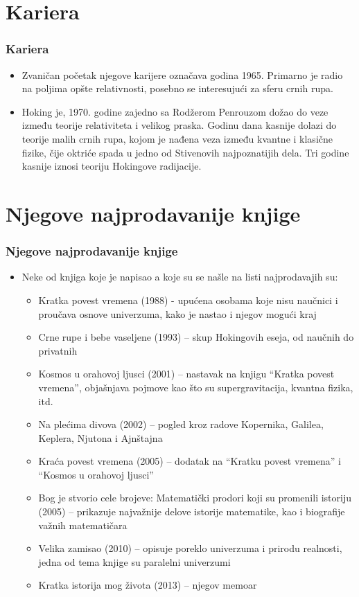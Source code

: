 \documentclass{beamer}
\begin{document}
\section{Kariera}

\begin{frame}[fragile]\frametitle{Kariera}
\begin{itemize}	 \fontsize{9}{6}\selectfont
\item  Zvaničan početak njegove karijere označava godina 1965. Primarno je radio na poljima opšte relativnosti, posebno se interesujući za sferu crnih rupa.
\item Hoking je, 1970. godine zajedno sa Rodžerom Penrouzom dožao do veze između teorije relativiteta i velikog praska. Godinu dana kasnije dolazi do teorije malih crnih rupa, kojom je nađena veza između kvantne i klasične fizike, čije oktriće spada u jedno od Stivenovih najpoznatijih dela. Tri godine kasnije iznosi teoriju Hokingove radijacije. 
\end{itemize}
\end{frame}

\section{Njegove najprodavanije knjige}

\begin{frame}[fragile]\frametitle{ Njegove najprodavanije knjige}
	\begin{itemize}	\fontsize{9}{6}\selectfont	
		\item Neke od knjiga koje je napisao a koje su se našle na listi najprodavajih su:
		\begin{itemize}\fontsize{9}{6}\selectfont
 \item Kratka povest vremena (1988) - upućena osobama koje nisu naučnici i proučava osnove univerzuma, kako je nastao i njegov mogući kraj
 \item Crne rupe i bebe vaseljene (1993) – skup Hokingovih eseja, od naučnih do privatnih
 \item Kosmos u orahovoj ljusci (2001) – nastavak na knjigu “Kratka povest vremena”, objašnjava pojmove kao što su supergravitacija, kvantna fizika, itd.
 \item Na plećima divova (2002) – pogled kroz radove Kopernika, Galilea, Keplera, Njutona i Ajnštajna
 \item Kraća povest vremena (2005) – dodatak na “Kratku povest vremena” i “Kosmos u orahovoj ljusci”
 \item Bog je stvorio cele brojeve: Matematički prodori koji su promenili istoriju (2005) –  prikazuje najvažnije delove istorije matematike, kao i biografije važnih matematičara
 \item Velika zamisao (2010) – opisuje poreklo univerzuma i prirodu realnosti, jedna od tema knjige su paralelni univerzumi
 \item Kratka istorija mog života (2013) – njegov memoar
\end{itemize}
\end{itemize}
\end{frame}
\end{document}
